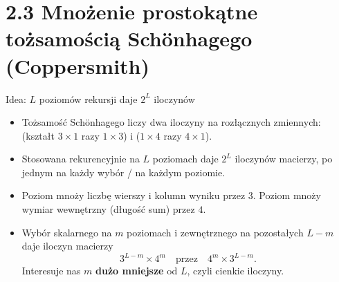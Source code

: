 \section{2.3 Mnożenie prostokątne tożsamością Schönhagego (Coppersmith)}

\begin{frame}{Idea: $L$ poziomów rekursji daje $2^L$ iloczynów}
  \begin{itemize}
    \item Tożsamość Schönhagego liczy dwa iloczyny na rozłącznych zmiennych:
       (kształt $3\times1$ razy $1\times3$) i  ($1\times4$ razy $4\times1$).
    \item Stosowana rekurencyjnie na $L$ poziomach daje $2^L$ iloczynów macierzy, po jednym na każdy wybór
      / na każdym poziomie.
    \item<2-> Poziom  mnoży liczbę wierszy i kolumn wyniku przez $3$. Poziom 
      mnoży wymiar wewnętrzny (długość sum) przez $4$.
    \item<3-> Wybór skalarnego na $m$ poziomach i zewnętrznego na pozostałych $L-m$ daje iloczyn macierzy
      \[3^{L-m}\times4^m\quad\text{przez}\quad4^m\times3^{L-m}.\]
      Interesuje nas $m$ \textbf{dużo mniejsze} od $L$, czyli cienkie iloczyny.
  \end{itemize}
\end{frame}


